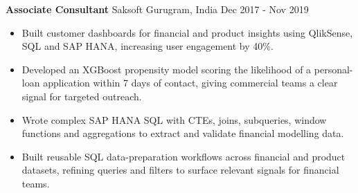\documentclass[10pt,a4paper]{article}
\newcommand{\role}[4]{\textbf{#1} \textbar{} #2 \hfill #3 \textbar{} #4\par}
\begin{document}
\vspace{3pt}
\role{Associate Consultant}{Saksoft}{Gurugram, India}{Dec 2017 - Nov 2019}
\begin{itemize}
  \item Built customer dashboards for financial and product insights using QlikSense, SQL and SAP HANA, increasing user engagement by 40\%.
  \item Developed an XGBoost propensity model scoring the likelihood of a personal-loan application within 7 days of contact, giving commercial teams a clear signal for targeted outreach.
  \item Wrote complex SAP HANA SQL with CTEs, joins, subqueries, window functions and aggregations to extract and validate financial modelling data.
  \item Built reusable SQL data-preparation workflows across financial and product datasets, refining queries and filters to surface relevant signals for financial teams.
\end{itemize}
\end{document}
